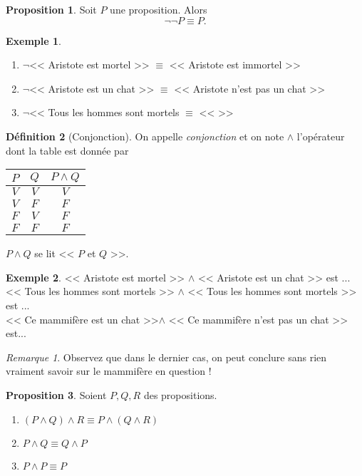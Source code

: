 \documentclass[11pt]{article}
\theoremstyle{definition}
\newtheorem{defn}{Définition}[section]
\newtheorem{prop}[defn]{Proposition}
\newtheorem{exe}{Exemple}
\theoremstyle{remark}
\newtheorem{rem}{Remarque}
\begin{document}
\begin{prop}
Soit $P$ une proposition. Alors
\[\neg\neg P \equiv P.
\]
\end{prop}

\begin{exe}\leavevmode\begin{enumerate}
\item $\neg$<< Aristote est mortel >> $\equiv$ << Aristote est immortel >>
\item $\neg$<< Aristote est un chat >> $\equiv$ << Aristote n'est pas un chat >>
\item $\neg$<< Tous les hommes sont mortels $\equiv$ << \hspace{7cm} >>
\end{enumerate}

\end{exe}


\begin{defn}[Conjonction]
On appelle \textit{conjonction} et on note $\land$ l'opérateur dont la table est donnée par
\begin{table}[h]
\centering
\begin{tabular}{|c|c|c|}\hline
$P$ & $Q$ & $P\land Q$ \\ \hline
$V$ & $V$ & $V$ \\\hline
$V$ & $F$ & $F$ \\\hline
$F$ & $V$ & $F$ \\\hline
$F$ & $F$ & $F$ \\\hline
\end{tabular}
\end{table}

$P\land Q$ se lit << $P$ et $Q$ >>.
\end{defn}

\begin{exe}
<< Aristote est mortel >> $\land$ << Aristote est un chat >> est ...\\
<< Tous les hommes sont mortels >> $\land$ << Tous les hommes sont mortels >> est ...\\
<< Ce mammifère est un chat >>$\land $ << Ce mammifère n'est pas un chat >> est... \\
\end{exe}

\begin{rem} Observez que dans le dernier cas, on peut conclure sans rien vraiment savoir sur le mammifère en question !
\end{rem}

\begin{prop}
Soient $P,Q,R$ des propositions.
\begin{enumerate}
\item $(P\land Q)\land R \equiv P\land (Q\land R)$
\item $P\land Q \equiv Q\land P$
\item $P\land P\equiv P$
\end{enumerate}

\end{prop}
\end{document}
